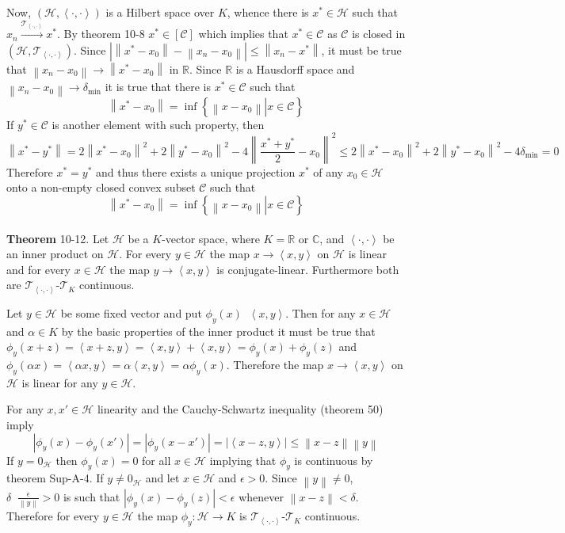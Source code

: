 \documentclass[a4paper]{article}
\newcommand{\obj}[1]{\left\{ #1 \right \}}
\newcommand{\clo}[1]{\left [ #1 \right ]}
\newcommand{\brac}[1]{\left ( #1 \right )}
\newcommand{\induc}[1]{\left . #1 \right \vert}
\newcommand{\abs}[1]{\left | #1 \right |}
\newcommand{\nrm}[1]{\left\| #1 \right \|}
\newcommand{\brkt}[1]{\left\langle #1 \right\rangle}
\newcommand{\Real}{\mathbb{R}}
\newcommand{\Cplx}{\mathbb{C}}
\newcommand{\Tcal}{\mathcal{T}}
\newcommand{\Hcal}{\mathcal{H}}
\newcommand{\Ccal}{\mathcal{C}}
\newcommand{\defn}{\mathop{\overset{\Delta}{=}}\nolimits}
\begin{document}
Now, $\brac{\Hcal, \brkt{\cdot, \cdot}}$ is a Hilbert space over $K$, whence there is $x^*\in \Hcal$ such that $x_n\overset{\Tcal_{\brkt{\cdot,\cdot}}}{\to}x^*$. By theorem 10-8 $x^*\in \clo{\Ccal}$ which implies that $x^*\in \Ccal$ as $\Ccal$ is closed in $\brac{\Hcal, \Tcal_{\brkt{\cdot,\cdot}}}$. Since $\abs{\nrm{x^*-x_0} - \nrm{x_n-x_0}}\leq \nrm{x_n-x^*}$, it must be true that $\nrm{x_n-x_0}\to\nrm{x^*-x_0}$ in $\Real$. Since $\Real$ is a Hausdorff space and $\nrm{x_n-x_0}\to\delta_{\text{min}}$ it is true that there is $x^*\in \Ccal$ such that \[\nrm{x^*-x_0}=\inf\obj{\induc{\nrm{x-x_0}} x\in \Ccal}\] If $y^*\in \Ccal$ is another element with such property, then \[\nrm{x^*-y^*} = 2\nrm{x^*-x_0}^2 + 2\nrm{y^*-x_0}^2 - 4\nrm{\frac{x^*+y^*}{2}-x_0}^2 \leq 2\nrm{x^*-x_0}^2 + 2\nrm{y^*-x_0}^2 - 4\delta_{\text{min}} = 0\] Therefore $x^*=y^*$ and thus there exists a unique projection $x^*$ of any $x_0\in \Hcal$ onto a non-empty closed convex subset $\Ccal$ such that \[\nrm{x^*-x_0} = \inf\obj{ \induc{ \nrm{x - x_0} } x\in \Ccal }\]\\

\label{thm:inner_product_map} \noindent \textbf{Theorem} 10-12.
Let $\Hcal$ be a $K$-vector space, where $K=\Real$ or $\Cplx$, and $\brkt{\cdot,\cdot}$ be an inner product on $\Hcal$. For every $y\in \Hcal$ the map $x\to \brkt{x,y}$ on $\Hcal$ is linear and for every $x\in \Hcal$ the map $y\to\brkt{x,y}$ is conjugate-linear. Furthermore both are $\Tcal_{\brkt{\cdot,\cdot}}$-$\Tcal_K$ continuous.

Let $y\in \Hcal$ be some fixed vector and put $\phi_y\brac{x}\defn \brkt{x,y}$. Then for any $x\in \Hcal$ and $\alpha\in K$ by the basic properties of the inner product it must be true that $\phi_y\brac{x+z} = \brkt{x+z,y} = \brkt{x,y}+\brkt{x,y}=\phi_y\brac{x}+\phi_y\brac{z}$ and $\phi_y\brac{\alpha x} = \brkt{\alpha x,y} = \alpha \brkt{x,y} = \alpha \phi_y\brac{x}$. Therefore the map $x\to \brkt{x,y}$ on $\Hcal$ is linear for any $y\in \Hcal$.

For any $x,x'\in \Hcal$ linearity and the Cauchy-Schwartz inequality (theorem 50) imply \[\abs{\phi_y\brac{x}-\phi_y\brac{x'}} = \abs{\phi_y\brac{x-x'}} = \abs{\brkt{x-z,y}}\leq \nrm{x-z} \nrm{y}\] If $y=0_\Hcal$ then $\phi_y\brac{x}=0$ for all $x\in \Hcal$ implying that $\phi_y$ is continuous by theorem Sup-A-4. If $y\neq 0_\Hcal$ and let $x\in \Hcal$ and $\epsilon>0$. Since $\nrm{y}\neq0$, $\delta \defn \frac{\epsilon}{\nrm{y}}>0$ is such that $\abs{\phi_y\brac{x}-\phi_y\brac{z}}<\epsilon$ whenever $\nrm{x-z}<\delta$. Therefore for every $y\in \Hcal$ the map $\phi_y:\Hcal\to K$ is $\Tcal_{\brkt{\cdot,\cdot}}$-$\Tcal_K$ continuous.
\end{document}
